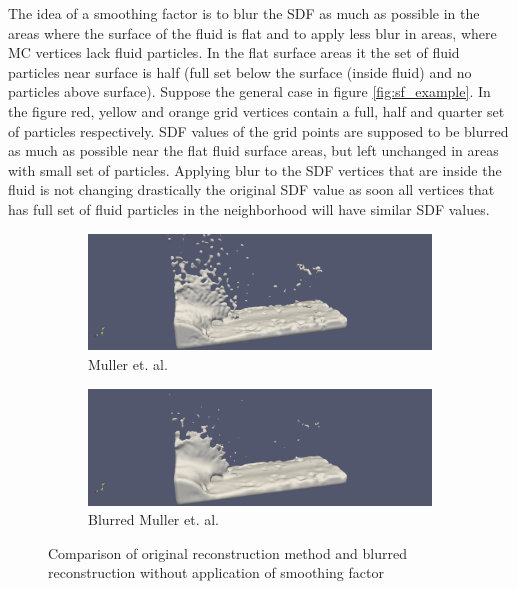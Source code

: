 The idea of a smoothing factor is to blur the SDF as much as possible in the areas where the surface of the fluid is flat and to apply less blur in areas, where MC vertices lack fluid particles. In the flat surface areas it the set of fluid particles near surface is half (full set below the surface (inside fluid) and no particles above surface). Suppose the general case in figure \ref{fig:sf_example}. In the figure red, yellow and orange grid vertices contain a full, half and quarter set of particles respectively. SDF values of the grid points are supposed to be blurred as much as possible near the flat fluid surface areas, but left unchanged in areas with small set of particles.
Applying blur to the SDF vertices that are inside the fluid is not changing drastically the original SDF value as soon all vertices that has full set of fluid particles in the neighborhood will have similar SDF values.\\
\begin{figure}[H]
	\begin{center}
		\begin{subfigure}[b]{\textwidth}
			\includegraphics[width=\textwidth]{figures/DenvityBlurredSplashArea.png}
			\caption{Muller et. al.}
			\label{fig:denc_rec}
		\end{subfigure}
		\begin{subfigure}[b]{\textwidth}
			\includegraphics[width=\textwidth]{figures/DenvityBasedSplashArea.png}
			\caption{Blurred Muller et. al.}
			\label{fig:blur_w_o_sf}
		\end{subfigure}
	\end{center}
	\caption{Comparison of original reconstruction method and blurred reconstruction without application of smoothing factor}
	\label{fig:blur_thin_area}
\end{figure}
